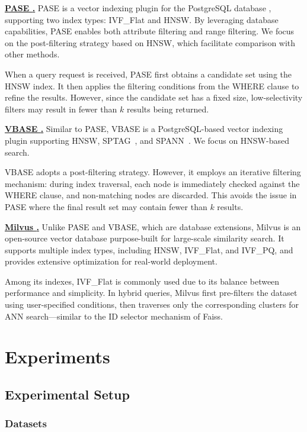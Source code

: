 \documentclass[sigconf, nonacm]{acmart}
\begin{document}
\noindent\textbf{\underline{PASE \cite{pase}.}}  
PASE is a vector indexing plugin for the PostgreSQL database \cite{postgresql13.4}, supporting two index types: IVF\_Flat \cite{johnson2019billion} and HNSW. By leveraging database capabilities, PASE enables both attribute filtering and range filtering. We focus on the post-filtering strategy based on HNSW, which facilitate comparison with other methods.

When a query request is received, PASE first obtains a candidate set using the HNSW index. It then applies the filtering conditions from the WHERE clause to refine the results. However, since the candidate set has a fixed size, low-selectivity filters may result in fewer than $k$ results being returned.


\noindent\textbf{\underline{VBASE \cite{vbase}.}}  
Similar to PASE, VBASE is a PostgreSQL-based vector indexing plugin supporting HNSW, SPTAG~\cite{sptag}, and SPANN~\cite{spann}. We focus on HNSW-based search.

VBASE adopts a post-filtering strategy. However, it employs an iterative filtering mechanism: during index traversal, each node is immediately checked against the WHERE clause, and non-matching nodes are discarded. This avoids the issue in PASE where the final result set may contain fewer than $k$ results.


\noindent\textbf{\underline{Milvus \cite{milvus}.}}  
Unlike PASE and VBASE, which are database extensions, Milvus is an open-source vector database purpose-built for large-scale similarity search. It supports multiple index types, including HNSW, IVF\_Flat, and IVF\_PQ, and provides extensive optimization for real-world deployment.

Among its indexes, IVF\_Flat is commonly used due to its balance between performance and simplicity. In hybrid queries, Milvus first pre-filters the dataset using user-specified conditions, then traverses only the corresponding clusters for ANN search—similar to the ID selector mechanism of Faiss.

\section{Experiments}
\subsection{Experimental Setup}
\subsubsection{Datasets}
\end{document}
